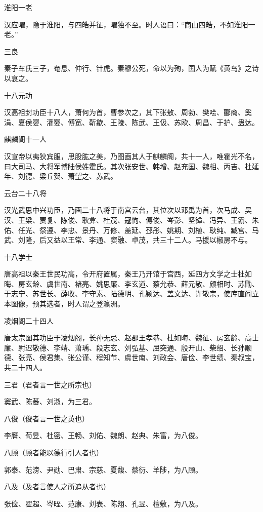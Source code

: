 \documentclass[a4paper,12pt,UTF8,twoside]{ctexbook}
\begin{document}
    淮阳一老
    
    汉应曜，隐于淮阳，与四皓并征，曜独不至。时人语曰：“商山四皓，不如淮阳一老。”
    
    三良
    
    秦子车氏三子，奄息、仲行、针虎。秦穆公死，命以为殉，国人为赋《黄鸟》之诗以哀之。
    
    十八元功
    
    汉高祖封功臣十八人，萧何为首，曹参次之，其下张敖、周勃、樊哙、郦商、奚涓、夏侯婴、灌婴、傅宽、靳歙、王陵、陈武、王伋、苏欧、周昌、于护、蛊达。
    
    麒麟阁十一人
    
    汉宣帝以夷狄宾服，思股肱之美，乃图画其人于麒麟阁，共十一人，唯霍光不名，曰大司马、大将军博陆侯姓霍氏。其次张安世、韩增、赵充国、魏相、丙吉、杜延年、刘德、梁丘贺、萧望之、苏武。
    
    云台二十八将
    
    汉光武思中兴功臣，乃画二十八将于南宫云台，其位次以邓禹为首，次马成、吴汉、王梁、贾复、陈俊、耿弇、杜茂、寇恂、傅俊、岑彭、坚镡、冯异、王霸、朱佑、任光、祭遵、李忠、景丹、万修、盖延、邳彤、姚期、刘植、耿纯、臧宫、马武、刘隆，后又益以王常、李通、窦融、卓茂，共三十二人。马援以椒房不与。
    
    十八学士
    
    唐高祖以秦王世民功高，令开府置属，秦王乃开馆于宫西，延四方文学之士杜如晦、房玄龄、虞世南、褚亮、姚思廉、李玄道、蔡允恭、薛元敬、颜相时、苏勖、于志宁、苏世长、薛收、李守素、陆德明、孔颖达、盖文达、许敬宗，使库直阎立本图像，预其选者，时人谓之登瀛洲。
    
    凌烟阁二十四人
    
    唐太宗图其功臣于凌烟阁，长孙无忌、赵郡王孝恭、杜如晦、魏征、房玄龄、高士廉、尉迟敬德、李靖、萧瑀、段志玄、刘弘基、屈突通、殷开山、柴绍、长孙顺德、张亮、侯君集、张公谨、程知节、虞世南、刘政会、唐俭、李世绩、秦叔宝，共二十四人。
    
    三君（君者言一世之所宗也）
    
    窦武、陈蕃、刘淑，为三君。
    
    八俊（俊者言一世之英也）
    
    李膺、荀昱、杜密、王畅、刘佑、魏朗、赵典、朱富，为八俊。
    
    八顾（顾者能以德行引人者也）
    
    郭泰、范滂、尹勋、巴肃、宗慈、夏馥、蔡衍、羊陟，为八顾。
    
    八及（及者言使人之所追从者也）
    
    张俭、翟超、岑晊、范康、刘表、陈翔、孔昱、檀敷，为八及。
    
\end{document}
